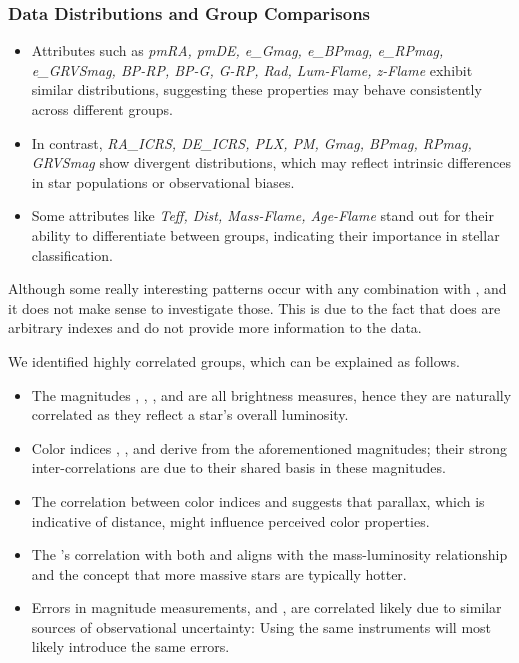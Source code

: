 \subsubsection*{Data Distributions and Group Comparisons}

\begin{itemize}
  \item Attributes such as \textit{pmRA, pmDE, e\_Gmag, e\_BPmag, e\_RPmag, e\_GRVSmag, BP-RP, BP-G, G-RP, Rad, Lum-Flame, z-Flame} exhibit similar distributions, suggesting these properties may behave consistently across different groups.
  \item In contrast, \textit{RA\_ICRS, DE\_ICRS, PLX, PM, Gmag, BPmag, RPmag, GRVSmag} show divergent distributions, which may reflect intrinsic differences in star populations or observational biases.
  \item Some attributes like \textit{Teff, Dist, Mass-Flame, Age-Flame} stand out for their ability to differentiate between groups, indicating their importance in stellar classification.
\end{itemize}






Although some really interesting patterns occur with any combination with ,  and  it does not make sense to investigate those. This is due to the fact that does are arbitrary indexes and do not provide more information to the data. 

We identified highly correlated groups, which can be explained as follows. 

\begin{itemize}
  \item The magnitudes , , , and  are all brightness measures, hence they are naturally correlated as they reflect a star's overall luminosity.
  \item Color indices , , and  derive from the aforementioned magnitudes; their strong inter-correlations are due to their shared basis in these magnitudes.
  \item The correlation between color indices and  suggests that parallax, which is indicative of distance, might influence perceived color properties.
  \item The 's correlation with both  and  aligns with the mass-luminosity relationship and the concept that more massive stars are typically hotter.
  \item Errors in magnitude measurements,  and , are correlated likely due to similar sources of observational uncertainty: Using the same instruments will most likely introduce the same errors.
\end{itemize}

